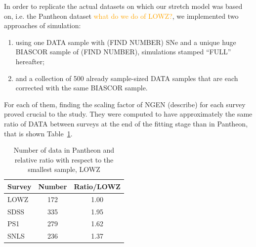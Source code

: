 \documentclass[]{aa}
\newcommand{\NN}[1]{\textcolor{orange}{#1}}
\begin{document}
In order to replicate the actual datasets on which our stretch model was based
on, i.e. the Pantheon dataset \NN{what do we do of LOWZ?}, we implemented two
approaches of simulation:

\begin{enumerate}
    \item using one DATA sample with (FIND NUMBER) SNe and a unique huge BIASCOR
        sample of (FIND NUMBER), simulations stamped ``FULL'' hereafter;
    \item and a collection of 500 already sample-sized DATA samples that are
        each corrected with the same BIASCOR sample.
\end{enumerate} 

For each of them, finding the scaling factor of NGEN (describe) for each survey
proved crucial to the study. They were computed to have approximately the same
ratio of DATA between surveys at the end of the fitting stage than in Pantheon,
that is shown Table~\ref{tab:ratio}.

\begin{table}
    \centering
    \caption{Number of data in Pantheon and relative ratio with respect to the
    smallest sample, LOWZ}
    \label{tab:ratio}
    \begin{tabular}{lcc}
        \toprule
        Survey & Number & Ratio/LOWZ \\
        \midrule
        LOWZ   & 172    & 1.00 \\
        SDSS   & 335    & 1.95 \\
        PS1    & 279    & 1.62 \\
        SNLS   & 236    & 1.37 \\
        \bottomrule
    \end{tabular}
\end{table}
\end{document}
